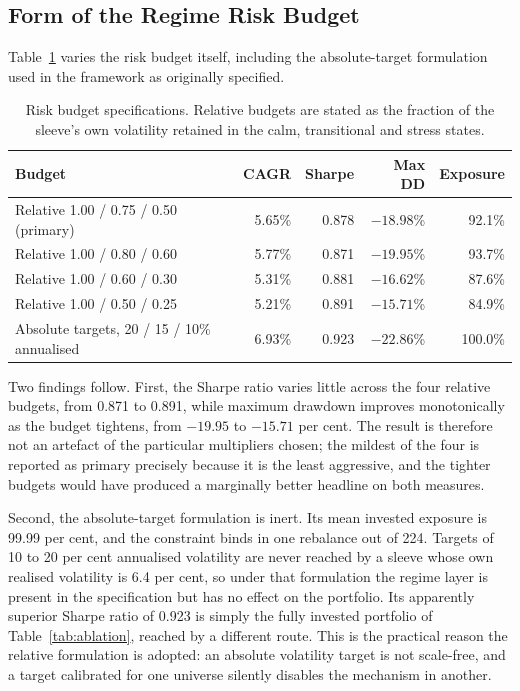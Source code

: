 \documentclass{singlecol-new}
\theoremstyle{TH}{
\newtheorem{lemma}{Lemma}
\newtheorem{theorem}[lemma]{Theorem}
\newtheorem{corrolary}[lemma]{Corrolary}
\newtheorem{conjecture}[lemma]{Conjecture}
\newtheorem{proposition}[lemma]{Proposition}
\newtheorem{claim}[lemma]{Claim}
\newtheorem{stheorem}[lemma]{Wrong Theorem}
\newtheorem{algorithm}{Algorithm}
}
\theoremstyle{THrm}{
\newtheorem{definition}{Definition}[section]
\newtheorem{question}{Question}[section]
\newtheorem{remark}{Remark}
\newtheorem{scheme}{Scheme}
}
\theoremstyle{THhit}{
\newtheorem{case}{Case}[section]
}
\begin{document}
\subsection{Form of the Regime Risk Budget}

Table~\ref{tab:budget} varies the risk budget itself, including the absolute-target formulation used
in the framework as originally specified.

\begin{table}[!ht]
\centering
\caption{Risk budget specifications. Relative budgets are stated as the fraction of the
sleeve's own volatility retained in the calm, transitional and stress states.}
\label{tab:budget}
\small
\begin{tabular}{p{4.6cm}rrrr}
\hline
\textbf{Budget} & \textbf{CAGR} & \textbf{Sharpe} & \textbf{Max DD} & \textbf{Exposure} \\
\hline
Relative 1.00 / 0.75 / 0.50 (primary) & 5.65\% & 0.878 & $-18.98$\% & 92.1\% \\
Relative 1.00 / 0.80 / 0.60 & 5.77\% & 0.871 & $-19.95$\% & 93.7\% \\
Relative 1.00 / 0.60 / 0.30 & 5.31\% & 0.881 & $-16.62$\% & 87.6\% \\
Relative 1.00 / 0.50 / 0.25 & 5.21\% & 0.891 & $-15.71$\% & 84.9\% \\
Absolute targets, 20 / 15 / 10\% annualised & 6.93\% & 0.923 & $-22.86$\% & 100.0\% \\
\hline
\end{tabular}
\end{table}

Two findings follow. First, the Sharpe ratio varies little across the four relative
budgets, from 0.871 to 0.891, while maximum drawdown improves monotonically as the
budget tightens, from $-19.95$ to $-15.71$ per cent. The result is therefore not an
artefact of the particular multipliers chosen; the mildest of the four is reported as
primary precisely because it is the least aggressive, and the tighter budgets would
have produced a marginally better headline on both measures.

Second, the absolute-target formulation is inert. Its mean invested exposure is 99.99
per cent, and the constraint binds in one rebalance out of 224. Targets of 10 to 20 per
cent annualised volatility are never reached by a sleeve whose own realised volatility
is 6.4 per cent, so under that formulation the regime layer is present in the
specification but has no effect on the portfolio. Its apparently superior Sharpe ratio
of 0.923 is simply the fully invested portfolio of Table~\ref{tab:ablation}, reached by a
different route. This is the practical reason the relative formulation is adopted: an
absolute volatility target is not scale-free, and a target calibrated for one universe
silently disables the mechanism in another.
\end{document}
